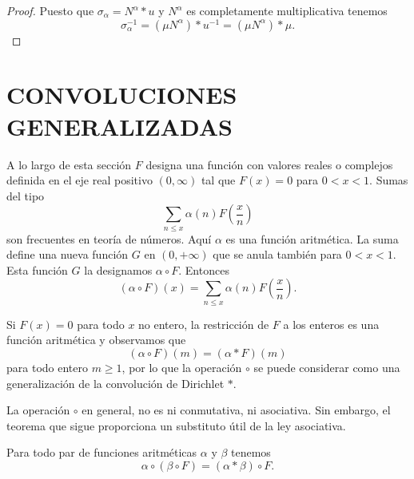 \documentclass[12pt,a4paper]{book}
\begin{document}
    \begin{proof}
        Puesto que $\sigma_\alpha=N^\alpha*u$ y $N^\alpha$ es completamente multiplicativa
        tenemos
        \begin{equation*}
            \sigma_\alpha^{-1}=(\mu N^\alpha)*u^{-1}=(\mu N^\alpha)*\mu.
        \end{equation*}
    \end{proof}

    \section{CONVOLUCIONES GENERALIZADAS}

    A lo largo de esta sección $F$ designa una función con valores reales o complejos
    definida en el eje real positivo $(0,\infty)$ tal que $F(x)=0$ para $0<x<1$. Sumas del
    tipo
    \begin{equation*}
        \sum_{n\leq x}\alpha(n)F\left(\frac{x}{n}\right)
    \end{equation*}
    son frecuentes en teoría de números. Aquí $\alpha$ es una función aritmética. La suma
    define una nueva función $G$ en $(0,+\infty)$ que se anula también para $0<x<1$. Esta
    función $G$ la designamos $\alpha\circ F$. Entonces
    \begin{equation*}
        (\alpha\circ F)(x)=\sum_{n\leq x}\alpha(n)F\left(\frac{x}{n}\right).
    \end{equation*}

    Si $F(x)=0$ para todo $x$ no entero, la restricción de $F$ a los enteros es una función
    aritmética y observamos que
    \begin{equation*}
        (\alpha\circ F)(m)=(\alpha*F)(m)
    \end{equation*}
    para todo entero $m\geq1$, por lo que la operación $\circ$ se puede considerar como una
    generalización de la convolución de Dirichlet $*$.

    La operación $\circ$ en general, no es ni conmutativa, ni asociativa. Sin embargo, el
    teorema que sigue proporciona un substituto útil de la ley asociativa.

    \begin{teorema}
        Para todo par de funciones aritméticas $\alpha$ y $\beta$ tenemos
        \begin{equation}
            \alpha\circ(\beta\circ F)=(\alpha*\beta)\circ F.
        \end{equation}
    \end{teorema}
\end{document}
